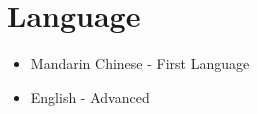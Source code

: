 \documentclass{aq-notes}
\begin{document}
    \section*{Language}
    \begin{itemize}
        \item Mandarin Chinese - First Language
        \item English - Advanced
    \end{itemize}
\end{document}

